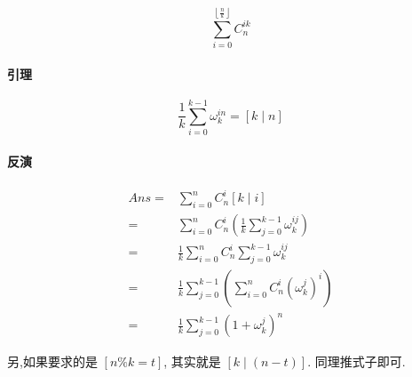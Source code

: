 $$\sum_{i=0}^{\left\lfloor \frac{n}{k} \right\rfloor} {C_n^{ik}}$$

\paragraph*{引理}

$$\frac{1}{k} \sum_{i=0}^{k-1} \omega_{k}^{in} = [k \mid n]$$

\paragraph*{反演}

$$\begin{aligned}
Ans =& \sum_{i=0}^n{C_n^i [k \mid i]} \\
=& \sum_{i=0}^n{C_n^i(\frac{1}{k}\sum_{j=0}^{k-1}{\omega_k^{ij}})} \\
=& \frac{1}{k} {\sum_{i=0}^{n}C_n^i \sum_{j=0}^{k-1} \omega_k^{ij}} \\
=& \frac{1}{k} {\sum_{j=0}^{k-1}(\sum_{i=0}^n C_n^i(\omega_k^j)^i)} \\
=& \frac{1}{k} \sum_{j=0}^{k-1} (1+\omega_k^j)^n
\end{aligned}$$

另,如果要求的是 $\left[n \% k = t\right]$, 其实就是 $\left[k \mid (n-t)\right]$. 同理推式子即可.